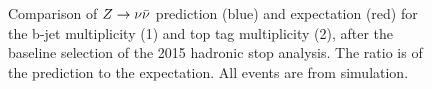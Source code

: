 \begin{figure}[tb!]
\centering
{}
\caption{Comparison of $Z\rightarrow \nu\bar{\nu}$ prediction (blue) and expectation (red) for the b-jet multiplicity (1) and top tag multiplicity (2), after the baseline selection of the 2015 hadronic stop analysis. The ratio is of the prediction to the expectation. All events are from simulation.}
\label{fig:ZInvBaseline_NbNt}
\end{figure}
